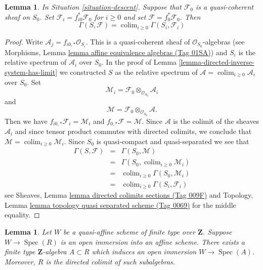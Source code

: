 \documentclass{amsart}
\theoremstyle{plain}
\newtheorem{lemma}[subsection]{Lemma}
\theoremstyle{definition}
\theoremstyle{remark}
\numberwithin{equation}{subsection}
\def\colim{\mathop{\mathrm{colim}}\nolimits}
\def\Spec{\mathop{\mathrm{Spec}}}
\begin{document}
\begin{lemma}
\label{lemma-descend-section}
In Situation \ref{situation-descent}.
Suppose that $\mathcal{F}_0$ is a quasi-coherent sheaf on $S_0$.
Set $\mathcal{F}_i = f_{i0}^*\mathcal{F}_0$ for $i \geq 0$ and set
$\mathcal{F} = f_0^*\mathcal{F}_0$.
Then
$$
\Gamma(S, \mathcal{F}) = \colim_{i \geq 0} \Gamma(S_i, \mathcal{F}_i)
$$
\end{lemma}

\begin{proof}
Write $\mathcal{A}_j = f_{i0, *} \mathcal{O}_{S_i}$.
This is a quasi-coherent sheaf of $\mathcal{O}_{S_0}$-algebras
(see Morphisms, Lemma \href{https://stacks.math.columbia.edu/tag/01SA}{lemma affine equivalence algebras (Tag 01SA)})
and $S_i$ is the relative spectrum of $\mathcal{A}_i$ over $S_0$.
In the proof of Lemma \ref{lemma-directed-inverse-system-has-limit}
we constructed $S$ as the relative spectrum of
$\mathcal{A} = \colim_{i \geq 0} \mathcal{A}_i$
over $S_0$. Set
$$
\mathcal{M}_i = \mathcal{F}_0 \otimes_{\mathcal{O}_{S_0}} \mathcal{A}_i
$$
and
$$
\mathcal{M} = \mathcal{F}_0 \otimes_{\mathcal{O}_{S_0}} \mathcal{A}.
$$
Then we have $f_{i0, *} \mathcal{F}_i = \mathcal{M}_i$
and $f_{0, *}\mathcal{F} = \mathcal{M}$. Since $\mathcal{A}$
is the colimit of the sheaves $\mathcal{A}_i$ and since tensor
product commutes with directed colimits, we conclude that
$\mathcal{M} = \colim_{i \geq 0} \mathcal{M}_i$.
Since $S_0$ is quasi-compact and quasi-separated we see that
\begin{eqnarray*}
\Gamma(S, \mathcal{F})
& = &
\Gamma(S_0, \mathcal{M}) \\
& = &
\Gamma(S_0, \colim_{i \geq 0} \mathcal{M}_i) \\
& = &
\colim_{i \geq 0} \Gamma(S_0, \mathcal{M}_i) \\
& = &
\colim_{i \geq 0} \Gamma(S_i, \mathcal{F}_i)
\end{eqnarray*}
see Sheaves, Lemma \href{https://stacks.math.columbia.edu/tag/009F}{lemma directed colimits sections (Tag 009F)} and
Topology, Lemma \href{https://stacks.math.columbia.edu/tag/0069}{lemma topology quasi separated scheme (Tag 0069)}
for the middle equality.
\end{proof}


\begin{lemma}
\label{lemma-quasi-affine-finite-type-over-Z}
Let $W$ be a quasi-affine scheme of finite type over
$\mathbf{Z}$. Suppose $W \to \Spec(R)$ is an
open immersion into an affine scheme. There exists a
finite type $\mathbf{Z}$-algebra $A \subset R$
which induces an open immersion $W \to \Spec(A)$.
Moreover, $R$ is the directed colimit of such subalgebras.
\end{lemma}
\end{document}
